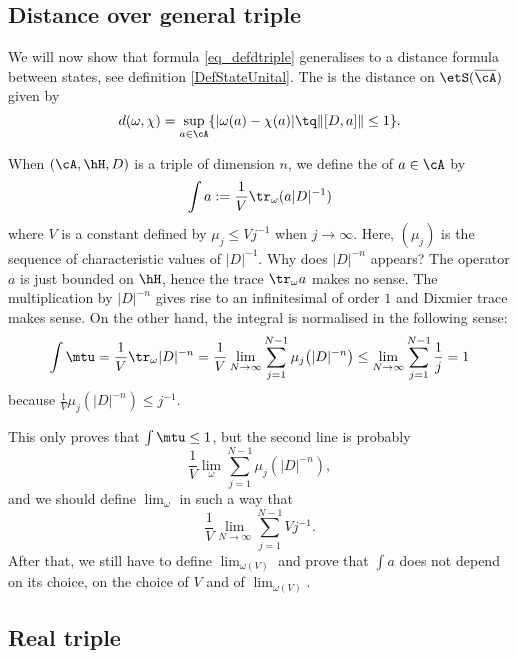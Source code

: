 \subsection{Distance over general triple}

We will now show that formula \eqref{eq_defdtriple} generalises to a distance formula between states, see definition \ref{DefStateUnital}. The  is the distance on $\etS(\overline{ \cA })$ given by
\begin{equation}
d(\omega,\chi)=\sup_{a\in\cA}\{ | \omega(a)-\chi(a) |\tq \| [D,a] \|\leq 1 \}.
\end{equation}

When $(\cA,\hH,D)$ is a triple of dimension $n$, we define the  of $a\in \cA$ by
\begin{equation}
\int a:=\frac{1}{ V }\tr_{\omega}(a| D |^{-1})
\end{equation}
where $V$ is a constant defined by $\mu_j\leq V j^{-1}$ when $j\to\infty$. Here, $(\mu_j)$ is the sequence of characteristic values of $| D |^{-1}$. Why does $| D |^{-n}$ appears? The operator $a$ is just bounded on $\hH$, hence the trace $\tr_{\omega}a$ makes no sense. The multiplication by $| D |^{-n}$ gives rise to an infinitesimal of order $1$ and Dixmier trace makes sense. On the other hand, the integral is normalised in the following sense:
\[ 
  \int\mtu=\frac{1}{ V }\tr_{\omega}| D |^{-n}
		=\frac{1}{ V }\lim_{N\to\infty}\sum_{j=1}^{N-1}\mu_j\big( | D |^{-n} \big)
		\leq\lim_{N\to\infty}\sum_{j=1}^{N-1}\frac{1}{ j }
		=1
\]
because $\frac{1}{ V }\mu_j(| D |^{-n})\leq j^{-1}$.

\begin{probleme}
	This only proves that $\int\mtu\leq1$, but the second line is probably
\[ 
  \frac{1}{ V }\lim_{\omega}\sum_{j=1}^{N-1}\mu_j(| D |^{-n}),
\]
and we should define $\lim_{\omega}$ in such a way that
\[ 
  \frac{1}{ V }\lim_{N\to\infty}\sum_{j=1}^{N-1}Vj^{-1}.
\]
After that, we still have to define $\lim_{\omega(V)}$ and prove that $\int a$ does not depend on its choice, on the choice of $V$ and of $\lim_{\omega(V)}$.
\end{probleme}

\subsection{Real triple}

